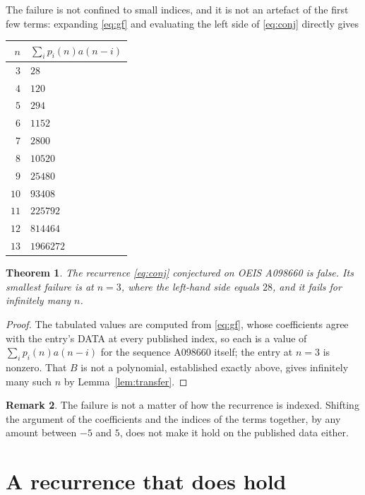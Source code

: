 \documentclass[11pt,a4paper]{article}
\theoremstyle{plain}
\newtheorem{theorem}{Theorem}
\theoremstyle{definition}
\newtheorem{remark}[theorem]{Remark}
\begin{document}
The failure is not confined to small indices, and it is not an artefact of the first few
terms: expanding \eqref{eq:gf} and evaluating the left side of \eqref{eq:conj} directly
gives

\begin{center}
\begin{tabular}{r@{\qquad}l}
$n$ & $\sum_{i}p_{i}(n)a(n-i)$ \\ \hline
$3$ & $28$ \\
$4$ & $120$ \\
$5$ & $294$ \\
$6$ & $1152$ \\
$7$ & $2800$ \\
$8$ & $10520$ \\
$9$ & $25480$ \\
$10$ & $93408$ \\
$11$ & $225792$ \\
$12$ & $814464$ \\
$13$ & $1966272$
\end{tabular}
\end{center}

\begin{theorem}
The recurrence \eqref{eq:conj} conjectured on OEIS A098660 is false. Its smallest failure
is at $n=3$, where the left-hand side equals $28$, and it fails for
infinitely many $n$.
\end{theorem}

\begin{proof}
The tabulated values are computed from \eqref{eq:gf}, whose coefficients agree with the
entry's DATA at every published index, so each is a value of $\sum_{i}p_{i}(n)a(n-i)$ for
the sequence A098660 itself; the entry at $n=3$ is nonzero. That $B$ is not a
polynomial, established exactly above, gives infinitely many such $n$ by
Lemma~\ref{lem:transfer}.
\end{proof}

\begin{remark}
The failure is not a matter of how the recurrence is indexed. Shifting the argument of the coefficients and the indices of the terms together, by any amount between $-5$ and $5$, does not make it hold on the published data either.
\end{remark}

\section{A recurrence that does hold}
\end{document}
